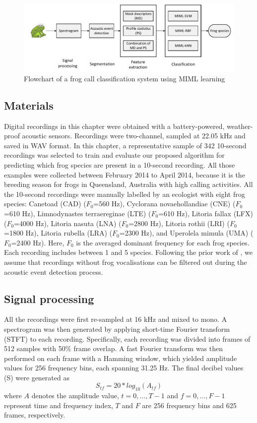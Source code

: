 \begin{figure}[htb!]
\centering
\includegraphics[width=\textwidth]{image/Ch6/flowchart.pdf}
\caption{Flowchart of a frog call classification system using MIML learning}
\label{fig:flowchart}
\end{figure}



\subsection{Materials}
\label{chap5:Materials}
Digital recordings in this chapter were obtained with a battery-powered, weather-proof acoustic sensors. Recordings were two-channel, sampled at 22.05 kHz and saved in WAV format. In this chapter, a representative sample of 342 10-second recordings was selected to train and evaluate our proposed algorithm for predicting which frog species are present in a 10-second recording. All those examples were collected between February 2014 to April 2014, because it is the breeding season for frogs in Queensland, Australia with high calling activities. All the 10-second recordings were manually labelled by an ecologist with eight frog species: Canetoad (CAD) 
($F_{0}$=560 Hz), Cyclorana novaehollandiae (CNE) ($F_{0}$=610 Hz), Limnodynastes terraereginae (LTE) ($F_{0}$=610 Hz), Litoria fallax (LFX) ($F_{0}$=4000 Hz), Litoria nasuta (LNA) ($F_{0}$=2800 Hz), Litoria rothii (LRI) ($F_{0}$=1800 Hz), Litoria rubella (LRA) ($F_{0}$=2300 Hz), and Uperolela mimula (UMA) ($F_{0}$=2400 Hz). Here, $F_{0}$ is the averaged dominant frequency for each frog species. Each recording includes between 1 and 5 species. Following the prior work of \cite{briggs2012acoustic}, we assume that recordings without  frog vocalisations can be filtered out during the acoustic event detection process.


\subsection{Signal processing}
All the recordings were first re-sampled at 16 kHz and mixed to mono. A spectrogram was then generated by applying short-time Fourier transform (STFT) to each recording. Specifically, each recording was
divided into frames of 512 samples with 50\% frame overlap.
A fast Fourier transform was then performed on each frame with a Hamming window, which yielded amplitude values for 256 frequency bins, each spanning 31.25 Hz. The final
decibel values (S) were generated as 
\begin{equation}
S_{tf} = 20*log_{10}(A_{tf})
\end{equation}
where $A$ denotes the amplitude value, $t=0,...,T-1$ and $f=0,...,F-1$ represent time and frequency index, $T$ and $F$ are 256 frequency bins and 625 frames, respectively. 

